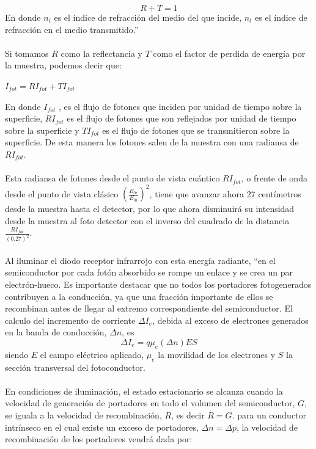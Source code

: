\documentclass[12]{article}
\begin{document}
\begin{multicols}{2}
\begin{equation}
R + T = 1 
\end{equation}
En donde $n_{i}$ es el índice de refracción del medio del que incide, $n_{t}$ es el índice de refracción en el medio transmitido.”\cite{OPTICA} \\\\
Si tomamos $R$ como la reflectancia y $T$ como el factor de perdida de energía por la muestra, podemos decir que: 
\begin{center}
$I_{fot} = RI_{fot} + TI_{fot} $
\end{center}
En donde $I_{fot}$ , es el flujo de fotones que inciden por unidad de tiempo sobre la superficie, $RI_{fot}$ es el flujo de fotones que son reflejados por unidad de tiempo sobre la superficie y $TI_{fot}$  es el flujo de fotones que se transmitieron sobre la superficie. De esta manera los fotones salen de la muestra con una radiansa de $RI_{fot}$.\\\\
Esta radiansa de fotones desde el punto de vista cuántico $RI_{fot}$, o frente de onda desde el punto de vista clásico $\left ( \frac{E_{0r}}{E_{0i}} \right) ^{2}$, tiene que avanzar ahora 27 centímetros desde la muestra hasta el detector, por lo que ahora disminuirá su intensidad desde la muestra al foto detector con el inverso del cuadrado de la distancia $\frac{RI_{fot}}{(0.27)^{2}}$.\\\\
Al iluminar el diodo receptor infrarrojo con esta energía radiante, ``en el semiconductor por cada fotón absorbido se rompe un enlace y se crea un par electrón-hueco. 
Es importante destacar que no todos los portadores fotogenerados contribuyen a la conducción, ya que una fracción importante de ellos se recombinan antes de llegar al extremo correspondiente del semiconductor. El calculo del incremento de corriente $\Delta I_{e}$, debida al exceso de electrones generados en la banda de conducción, $\Delta n$, es
\begin {equation}
\Delta I_{e} = q\mu _{e}(\Delta n)ES
\end{equation} 
siendo $E$ el campo eléctrico aplicado, $\mu_{e}$ la movilidad de los electrones y $S$ la sección transversal del fotoconductor.\\\\
En condiciones de iluminación, el estado estacionario se alcanza cuando la velocidad de generación de portadores en todo el volumen del semiconductor, $G$, se iguala a la velocidad de recombinación, $R$, es decir $R = G$. para un conductor intrínseco en el cual existe un exceso de portadores, $\Delta n = \Delta p$, la velocidad de recombinación de los portadores vendrá dada por:

\end{multicols}
\end{document}
